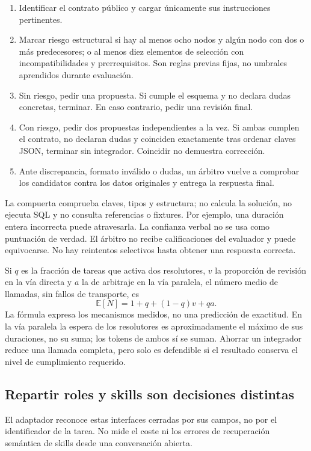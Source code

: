 \documentclass[11pt,a4paper]{article}
\begin{document}
\begin{enumerate}
\item Identificar el contrato público y cargar únicamente sus instrucciones pertinentes.
\item Marcar riesgo estructural si hay al menos ocho nodos y algún nodo con dos o
más predecesores; o al menos diez elementos de selección con incompatibilidades
y prerrequisitos. Son reglas previas fijas, no umbrales aprendidos durante evaluación.
\item Sin riesgo, pedir una propuesta. Si cumple el esquema y no declara dudas
concretas, terminar. En caso contrario, pedir una revisión final.
\item Con riesgo, pedir dos propuestas independientes a la vez. Si ambas cumplen
el contrato, no declaran dudas y coinciden exactamente tras ordenar claves JSON,
terminar sin integrador. Coincidir no demuestra corrección.
\item Ante discrepancia, formato inválido o dudas, un árbitro vuelve a comprobar
los candidatos contra los datos originales y entrega la respuesta final.
\end{enumerate}

La compuerta comprueba claves, tipos y estructura; no calcula la solución, no
ejecuta SQL y no consulta referencias o fixtures. Por ejemplo, una duración
entera incorrecta puede atravesarla. La confianza verbal no se usa como puntuación
de verdad. El árbitro no recibe calificaciones del evaluador y puede equivocarse.
No hay reintentos selectivos hasta obtener una respuesta correcta.

Si $q$ es la fracción de tareas que activa dos resolutores, $v$ la proporción de
revisión en la vía directa y $a$ la de arbitraje en la vía paralela, el número
medio de llamadas, sin fallos de transporte, es
\[
\mathbb{E}[N]=1+q+(1-q)v+qa.
\]
La fórmula expresa los mecanismos medidos, no una predicción de exactitud. En la
vía paralela la espera de los resolutores es aproximadamente el máximo de sus
duraciones, no su suma; los tokens de ambos sí se suman. Ahorrar un integrador
reduce una llamada completa, pero solo es defendible si el resultado conserva
el nivel de cumplimiento requerido.

\subsection{Repartir roles y skills son decisiones distintas}
El adaptador reconoce estas interfaces cerradas por sus campos, no por el
identificador de la tarea. No mide el coste ni los errores de recuperación
semántica de skills desde una conversación abierta.
\end{document}
